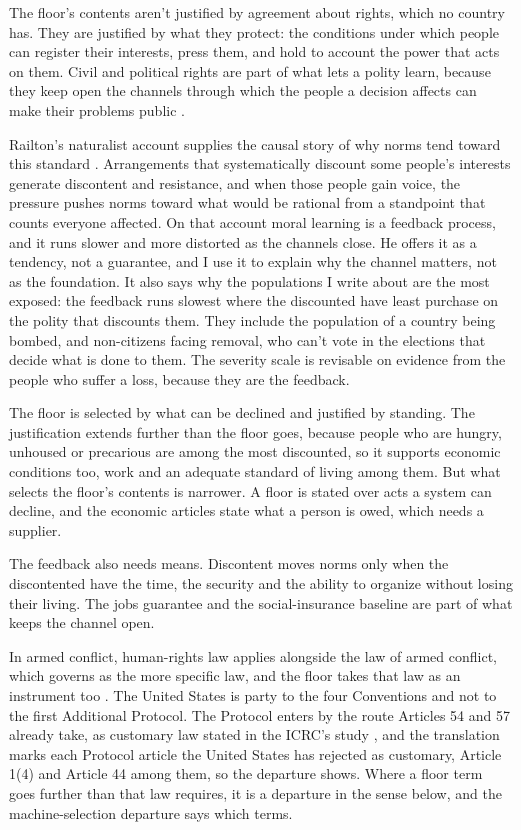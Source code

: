 The floor's contents aren't justified by agreement about rights, which no country has. They are justified by what they protect: the conditions under which people can register their interests, press them, and hold to account the power that acts on them. Civil and political rights are part of what lets a polity learn, because they keep open the channels through which the people a decision affects can make their problems public \autocite{dewey1927public}.

Railton's naturalist account supplies the causal story of why norms tend toward this standard \autocite{railton1986moral}. Arrangements that systematically discount some people's interests generate discontent and resistance, and when those people gain voice, the pressure pushes norms toward what would be rational from a standpoint that counts everyone affected. On that account moral learning is a feedback process, and it runs slower and more distorted as the channels close. He offers it as a tendency, not a guarantee, and I use it to explain why the channel matters, not as the foundation. It also says why the populations I write about are the most exposed: the feedback runs slowest where the discounted have least purchase on the polity that discounts them. They include the population of a country being bombed, and non-citizens facing removal, who can't vote in the elections that decide what is done to them. The severity scale is revisable on evidence from the people who suffer a loss, because they are the feedback.

The floor is selected by what can be declined and justified by standing. The justification extends further than the floor goes, because people who are hungry, unhoused or precarious are among the most discounted, so it supports economic conditions too, work and an adequate standard of living among them. But what selects the floor's contents is narrower. A floor is stated over acts a system can decline, and the economic articles state what a person is owed, which needs a supplier.

The feedback also needs means. Discontent moves norms only when the discontented have the time, the security and the ability to organize without losing their living. The jobs guarantee and the social-insurance baseline are part of what keeps the channel open.

In armed conflict, human-rights law applies alongside the law of armed conflict, which governs as the more specific law, and the floor takes that law as an instrument too \autocite{gci1949,gcii1949,gciii1949,gciv1949,api1977}. The United States is party to the four Conventions and not to the first Additional Protocol. The Protocol enters by the route Articles 54 and 57 already take, as customary law stated in the ICRC's study \autocite{Henckaerts2005CustomaryIHL}, and the translation marks each Protocol article the United States has rejected as customary, Article 1(4) and Article 44 among them, so the departure shows. Where a floor term goes further than that law requires, it is a departure in the sense below, and the machine-selection departure says which terms.

